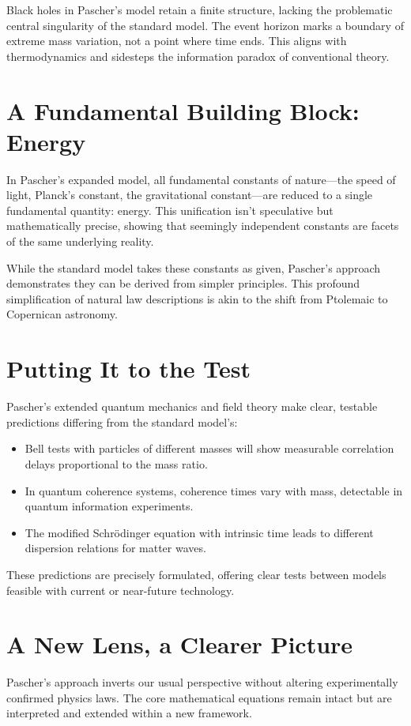 \documentclass[a4paper,12pt]{article}
\begin{document}
	Black holes in Pascher’s model retain a finite structure, lacking the problematic central singularity of the standard model. The event horizon marks a boundary of extreme mass variation, not a point where time ends. This aligns with thermodynamics and sidesteps the information paradox of conventional theory.
	
	\section{A Fundamental Building Block: Energy}
	In Pascher’s expanded model, all fundamental constants of nature—the speed of light, Planck’s constant, the gravitational constant—are reduced to a single fundamental quantity: energy. This unification isn’t speculative but mathematically precise, showing that seemingly independent constants are facets of the same underlying reality.
	
	While the standard model takes these constants as given, Pascher’s approach demonstrates they can be derived from simpler principles. This profound simplification of natural law descriptions is akin to the shift from Ptolemaic to Copernican astronomy.

	
	\section{Putting It to the Test}
	Pascher’s extended quantum mechanics and field theory make clear, testable predictions differing from the standard model’s:
	
	\begin{itemize}
		\item Bell tests with particles of different masses will show measurable correlation delays proportional to the mass ratio.
		\item In quantum coherence systems, coherence times vary with mass, detectable in quantum information experiments.
		\item The modified Schrödinger equation with intrinsic time leads to different dispersion relations for matter waves.
	\end{itemize}
	
	These predictions are precisely formulated, offering clear tests between models feasible with current or near-future technology.
	
	\section{A New Lens, a Clearer Picture}
	Pascher’s approach inverts our usual perspective without altering experimentally confirmed physics laws. The core mathematical equations remain intact but are interpreted and extended within a new framework.
	
\end{document}
